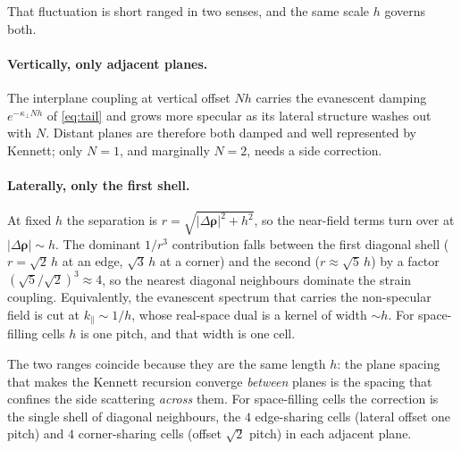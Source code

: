 \documentclass[11pt,a4paper]{article}
\newcommand{\brho}{\boldsymbol{\rho}}
\begin{document}
That fluctuation is short ranged in two senses, and the same scale $h$ governs both.

\paragraph{Vertically, only adjacent planes.} The interplane coupling at vertical offset $Nh$
carries the evanescent damping $e^{-\kappa_\perp Nh}$ of \eqref{eq:tail} and grows more specular
as its lateral structure washes out with $N$. Distant planes are therefore both damped and
well represented by Kennett; only $N=1$, and marginally $N=2$, needs a side correction.

\paragraph{Laterally, only the first shell.} At fixed $h$ the separation is
$r=\sqrt{|\Delta\brho|^{2}+h^{2}}$, so the near-field terms turn over at $|\Delta\brho|\sim h$.
The dominant $1/r^{3}$ contribution falls between the first diagonal shell ($r=\sqrt2\,h$ at an
edge, $\sqrt3\,h$ at a corner) and the second ($r\approx\sqrt5\,h$) by a factor
$(\sqrt5/\sqrt2)^{3}\approx 4$, so the nearest diagonal neighbours dominate the strain coupling.
Equivalently, the evanescent spectrum that carries the non-specular field is cut at
$k_\parallel\sim 1/h$, whose real-space dual is a kernel of width $\sim h$. For space-filling
cells $h$ is one pitch, and that width is one cell.

The two ranges coincide because they are the same length $h$: the plane spacing that makes the
Kennett recursion converge \emph{between} planes is the spacing that confines the side
scattering \emph{across} them. For space-filling cells the correction is the single shell of
diagonal neighbours, the $4$ edge-sharing cells (lateral offset one pitch) and $4$
corner-sharing cells (offset $\sqrt2$ pitch) in each adjacent plane.
\end{document}
